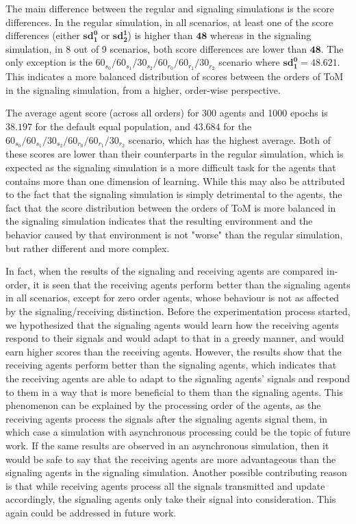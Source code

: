 The main difference between the regular and signaling simulations is the score differences. In the regular simulation, in all scenarios, at least one of the score differences (either $\mathbf{sd^0_1}$ or $\mathbf{sd^1_2}$) is higher than $\mathbf{48}$ whereas in the signaling simulation, in 8 out of 9 scenarios, both score differences are lower than $\mathbf{48}$. The only exception is the $60_{s_{0}}/60_{s_{1}}/30_{s_{2}}/60_{r_{0}}/60_{r_{1}}/30_{r_{2}}$ scenario where $\mathbf{sd^0_1 = 48.621}$. This indicates a more balanced distribution of scores between the orders of ToM in the signaling simulation, from a higher, order-wise perspective.

The average agent score (across all orders) for 300 agents and 1000 epochs is $\mathbf{38.197}$ for the default equal population, and $\mathbf{43.684}$ for the $60_{s_{0}}/60_{s_{1}}/30_{s_{2}}/60_{r_{0}}/60_{r_{1}}/30_{r_{2}}$ scenario, which has the highest average. Both of these scores are lower than their counterparts in the regular simulation, which is expected as the signaling simulation is a more difficult task for the agents that contains more than one dimension of learning. While this may also be attributed to the fact that the signaling simulation is simply detrimental to the agents, the fact that the score distribution between the orders of ToM is more balanced in the signaling simulation indicates that the resulting environment and the behavior caused by that environment is not "worse" than the regular simulation, but rather different and more complex.

In fact, when the results of the signaling and receiving agents are compared in-order, it is seen that the receiving agents perform better than the signaling agents in all scenarios, except for zero order agents, whose behaviour is not as affected by the signaling/receiving distinction. Before the experimentation process started, we hypothesized that the signaling agents would learn how the receiving agents respond to their signals and would adapt to that in a greedy manner, and would earn higher scores than the receiving agents. However, the results show that the receiving agents perform better than the signaling agents, which indicates that the receiving agents are able to adapt to the signaling agents' signals and respond to them in a way that is more beneficial to them than the signaling agents. This phenomenon can be explained by the processing order of the agents, as the receiving agents process the signals after the signaling agents signal them, in which case a simulation with asynchronous processing could be the topic of future work. If the same results are observed in an asynchronous simulation, then it would be safe to say that the receiving agents are more advantageous than the signaling agents in the signaling simulation. Another possible contributing reason is that while receiving agents process all the signals transmitted and update accordingly, the signaling agents only take their signal into consideration. This again could be addressed in future work.

